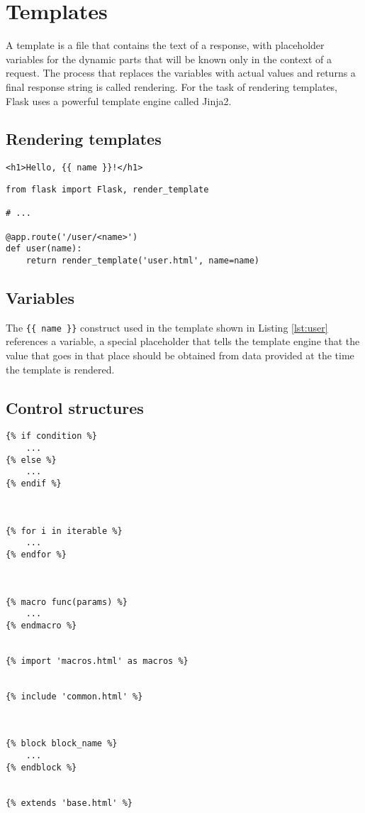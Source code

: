 
\chapter{Templates}
\label{cha:templates}

A template is a file that contains the text of a response, with placeholder variables for the dynamic parts that will be known only in the context of a request.
The process that replaces the variables with actual values and returns a final response string is called rendering.
For the task of rendering templates, Flask uses a powerful template engine called Jinja2.


\section{Rendering templates}
\label{sec:rendering-templates}

\begin{lstlisting}[caption={templates/user.html},label={lst:user}]
<h1>Hello, {{ name }}!</h1>
\end{lstlisting}

\begin{lstlisting}[caption=rendering a template]
from flask import Flask, render_template

# ...

@app.route('/user/<name>')
def user(name):
    return render_template('user.html', name=name)
\end{lstlisting}

\section{Variables}
\label{sec:variables}

The \lstinline|{{ name }}| construct used in the template shown in Listing \ref{lst:user} references a variable, a special placeholder that tells the template engine that the value that goes in that place should be obtained from data provided at the time the template is rendered.

\section{Control structures}
\label{sec:control-structures}

\begin{lstlisting}
{% if condition %}
    ...
{% else %}
    ...
{% endif %}



{% for i in iterable %}
    ...
{% endfor %}



{% macro func(params) %}
    ...
{% endmacro %}


{% import 'macros.html' as macros %}


{% include 'common.html' %}



{% block block_name %}
    ...
{% endblock %}


{% extends 'base.html' %}
\end{lstlisting}


